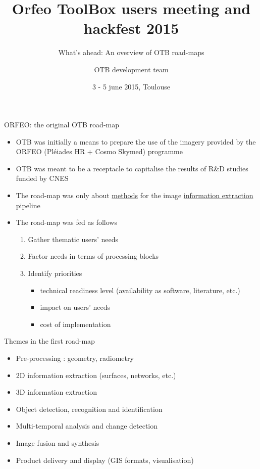 \documentclass[8pt]{beamer}
\subtitle{What's ahead: An overview of OTB road-maps}
\author{OTB development team}
\date{3 - 5 june 2015, Toulouse}
\title{Orfeo ToolBox users meeting and hackfest 2015}
\begin{document}
\maketitle


\begin{frame}[label=sec-1]{ORFEO: the original OTB road-map}
\begin{itemize}
\item OTB was initially a means to prepare the use of the imagery provided
by the ORFEO (Pléiades HR + Cosmo Skymed) programme
\item OTB was meant to be a receptacle to capitalise the results of R\&D
studies funded by CNES
\item The road-map was only about \uline{methods} for the image \uline{information
extraction} pipeline
\item The road-map was fed as follows
\begin{enumerate}
\item Gather thematic users' needs
\item Factor needs in terms of processing blocks
\item Identify priorities
\begin{itemize}
\item technical readiness level (availability as software, literature, etc.)
\item impact on users' needs
\item cost of implementation
\end{itemize}
\end{enumerate}
\end{itemize}
\end{frame}
\begin{frame}[label=sec-2]{Themes in the first road-map}
\begin{itemize}
\item Pre-processing : geometry, radiometry
\item 2D information extraction (surfaces, networks, etc.)
\item 3D information extraction
\item Object detection, recognition and identification
\item Multi-temporal analysis and change detection
\item Image fusion and synthesis
\item Product delivery and display (GIS formats, visualisation)
\end{itemize}
\end{frame}
\end{document}

